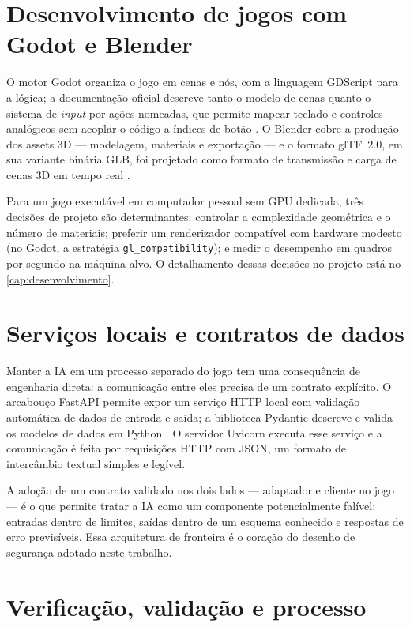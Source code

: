 \section{Desenvolvimento de jogos com Godot e Blender}
\label{sec:godot_blender}

O motor Godot organiza o jogo em cenas e nós, com a linguagem GDScript para a
lógica; a documentação oficial descreve tanto o modelo de cenas quanto o
sistema de \emph{input} por ações nomeadas, que permite mapear teclado e
controles analógicos sem acoplar o código a índices de botão
\cite{godot2026}. O Blender cobre a produção dos assets 3D --- modelagem,
materiais e exportação --- e o formato glTF~2.0, em sua variante binária GLB,
foi projetado como formato de transmissão e carga de cenas 3D em tempo real
\cite{blender2026,khronos2026gltf}.

Para um jogo executável em computador pessoal sem GPU dedicada, três decisões
de projeto são determinantes: controlar a complexidade geométrica e o número
de materiais; preferir um renderizador compatível com hardware modesto (no
Godot, a estratégia \texttt{gl\_compatibility}); e medir o desempenho em
quadros por segundo na máquina-alvo. O detalhamento dessas decisões no
projeto está no \autoref{cap:desenvolvimento}.

\section{Serviços locais e contratos de dados}
\label{sec:servicos}

Manter a IA em um processo separado do jogo tem uma consequência de engenharia
direta: a comunicação entre eles precisa de um contrato explícito. O arcabouço
FastAPI permite expor um serviço HTTP local com validação automática de dados
de entrada e saída; a biblioteca Pydantic descreve e valida os modelos de
dados em Python \cite{fastapi2026,pydantic2026,python2026}. O servidor Uvicorn executa
esse serviço \cite{uvicorn2026} e a comunicação é feita por requisições HTTP
com JSON, um formato de intercâmbio textual simples e legível.

A adoção de um contrato validado nos dois lados --- adaptador e cliente no
jogo --- é o que permite tratar a IA como um componente potencialmente
falível: entradas dentro de limites, saídas dentro de um esquema conhecido e
respostas de erro previsíveis. Essa arquitetura de fronteira é o coração do
desenho de segurança adotado neste trabalho.

\section{Verificação, validação e processo}
\label{sec:verificacao}

